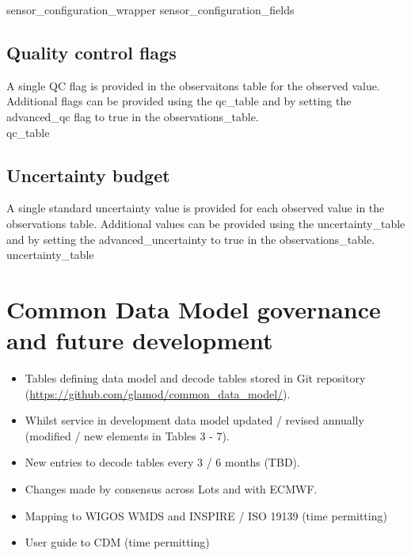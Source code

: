 \documentclass[a4paper]{article}
\begin{document}
 {sensor_configuration_wrapper}
 {sensor_configuration_fields}

\subsection {Quality control flags}
A single QC flag is provided in the observaitons table for the observed value. Additional flags can be provided using the qc\_table and by setting the advanced\_qc flag to true in the observations\_table.\\
 {qc_table}

\subsection {Uncertainty budget}
A single standard uncertainty value is provided for each observed value in the observations table. Additional values can be provided using the uncertainty\_table and by setting the advanced\_uncertainty to true in the observations\_table.\\
 {uncertainty_table}


\section {Common Data Model governance and future development}
\begin{itemize}
\item Tables defining data model and decode tables stored in Git repository (\url{https://github.com/glamod/common_data_model/}).
\item Whilst service in development data model updated / revised annually (modified / new elements in Tables 3 - 7).
\item New entries to decode tables every 3 / 6 months (TBD).
\item Changes made by consensus across Lots and with ECMWF.
\item Mapping to WIGOS WMDS and INSPIRE / ISO 19139 (time permitting)
\item User guide to CDM (time permitting)
\end{itemize}
\end{document}
